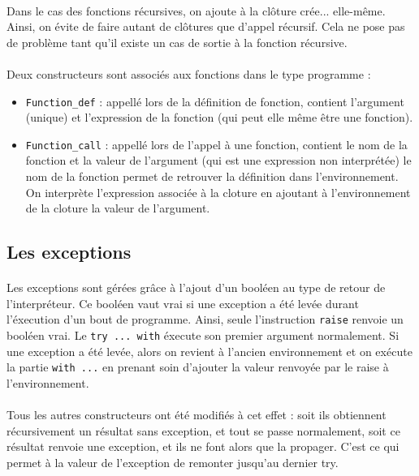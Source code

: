 \paragraph{} Dans le cas des fonctions récursives, on ajoute à la clôture crée... elle-même. Ainsi, on évite de faire autant de clôtures que d'appel récursif. Cela ne pose pas de problème tant qu'il existe un cas de sortie à la fonction récursive.

\paragraph{} Deux constructeurs sont associés aux fonctions dans le type programme :
    \begin{itemize}
     \item \texttt{Function\_def} : appellé lors de la définition de fonction, contient l'argument (unique) et l'expression de la fonction (qui peut elle même être une fonction).
     \item \texttt{Function\_call} : appellé lors de l'appel à une fonction, contient le nom de la fonction et la valeur de l'argument (qui est une expression non interprétée)
                        le nom de la fonction permet de retrouver la définition dans l'environnement. On interprète l'expression associée à la cloture en ajoutant à l'environnement de la cloture la valeur de l'argument.
    \end{itemize}


\subsection{Les exceptions}

\paragraph{} Les exceptions sont gérées grâce à l'ajout d'un booléen au type de retour de l'interpréteur. Ce booléen vaut vrai si une exception a été levée durant l'éxecution d'un bout de programme. Ainsi, seule l'instruction \texttt{raise} renvoie un booléen vrai. Le \texttt{try ... with} éxecute son premier argument normalement. Si une exception a été levée, alors on revient à l'ancien environnement et on exécute la partie \texttt{with ...} en prenant soin d'ajouter la valeur renvoyée par le raise à l'environnement.

\paragraph{} Tous les autres constructeurs ont été modifiés à cet effet : soit ils obtiennent récursivement un résultat sans exception, et tout se passe normalement, soit ce résultat renvoie une exception, et ils ne font alors que la propager. C'est ce qui permet à la valeur de l'exception de remonter jusqu'au dernier try.

